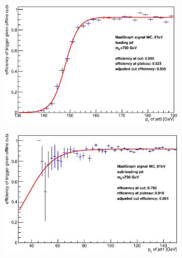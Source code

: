 \begin{figure}[phtb!]
\begin{center}
  \begin{subfigure}[leading jet, $m_{A}=700$ GeV]{0.4\textwidth}\includegraphics[width=\textwidth]{Systematics/images/jet0_trigger_turn_on_bAbb_700_j35.eps}\end{subfigure}
  \begin{subfigure}[sub-leading jet, $m_{A}=700$ GeV]{0.4\textwidth}\includegraphics[width=\textwidth]{Systematics/images/jet1_trigger_turn_on_bAbb_700_j35.eps}\end{subfigure}

\end{center}
\end{figure}
